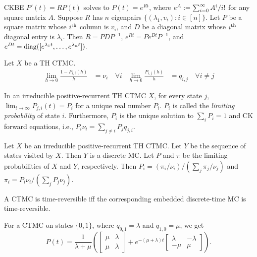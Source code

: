 \documentclass[a4paper, 12pt, fleqn]{article}
\begin{document}
\begin{lemma}
CKBE $P'(t) = RP(t)$ solves to $P(t) = e^{Rt}$,
where $e^{A} := \sum_{i=0}^{\infty} A^i/i!$ for any square matrix $A$.
Suppose $R$ has $n$ eigenpairs $\{(\lambda_1, v_i): i \in [n]\}$.
Let $P$ be a square matrix whose $i^{\textrm{th}}$ column is $v_i$,
and $D$ be a diagonal matrix whose $i^{\textrm{th}}$ diagonal entry is $\lambda_i$.
Then $R = PDP^{-1}$, $e^{Rt} = Pe^{Dt}P^{-1}$,
and $e^{Dt} = \operatorname{diag}([e^{\lambda_1t}, \ldots, e^{\lambda_nt}])$.
\end{lemma}

\begin{lemma}
Let $X$ be a TH CTMC.
\begin{align*}
\lim_{h \to 0} \frac{1-P_{i,i}(h)}{h} &= \nu_i\quad\forall i
& \lim_{h \to 0} \frac{P_{i,j}(h)}{h} &= q_{i,j}\quad\forall i \neq j
\end{align*}
\end{lemma}

\begin{lemma}
\label{thm:ctmc:limprob}
In an irreducible positive-recurrent TH CTMC $X$, for every state $j$,
$\lim_{t \to \infty} P_{j,i}(t) = P_i$ for a unique real number $P_i$.
$P_i$ is called the \emph{limiting probability} of state $i$.
Furthermore, $P_i$ is the unique solution to $\sum_i P_i = 1$ and CK forward equations,
i.e., $P_i\nu_i = \sum_{j \neq i} P_jq_{j,i}$.
\end{lemma}

\begin{lemma}
Let $X$ be an irreducible positive-recurrent TH CTMC. Let $Y$ be the sequence of states visited by $X$.
Then $Y$ is a discrete MC. Let $P$ and $\pi$ be the limiting probabilities of $X$ and $Y$, respectively.
Then $P_i = (\pi_i/\nu_i)/(\sum_j \pi_j/\nu_j)$ and $\pi_i = P_i\nu_i/(\sum_j P_j\nu_j)$.
\end{lemma}

\begin{definition}
A CTMC is time-reversible iff the corresponding embedded discrete-time MC is time-reversible.
\end{definition}

\begin{lemma}[2-state]
For a CTMC on states $\{0, 1\}$, where $q_{0,1} = \lambda$ and $q_{1,0} = \mu$, we get
\[ P(t) = \frac{1}{\lambda + \mu}\left(
\begin{bmatrix}\mu & \lambda \\ \mu & \lambda\end{bmatrix}
+ e^{-(\mu+\lambda)t}\begin{bmatrix}\lambda & -\lambda \\ -\mu & \mu\end{bmatrix}
\right). \]
\end{lemma}
\end{document}
